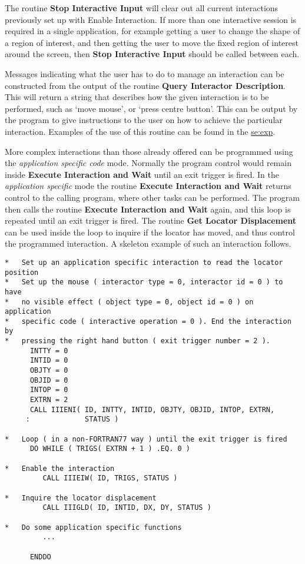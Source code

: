 The routine {\bf Stop Interactive Input} will clear out all current
interactions previously set up with {Enable Interaction}. If more than
one interactive session is required in a single application, for
example getting a user to change the shape of a region of interest,
and then getting the user to move the fixed region of interest around
the screen, then {\bf Stop Interactive Input} should be called between
each.

Messages indicating what the user has to do to manage an interaction
can be constructed from the output of the routine
{\bf Query Interactor Description}. This will return a string that describes
how the given interaction is to be performed, such as `move mouse', or
`press centre button'. This can be output by the program to give
instructions to the user on how to achieve the particular interaction.
Examples of the use of this routine can be found in the 
\hyperref{example program}{example program in appendix~}{}{se:exp}.

More complex interactions than those already offered can be programmed
using the {\it application specific code} mode. Normally the program control
would remain inside {\bf Execute Interaction and Wait} until an exit
trigger is fired. In the {\it application specific} mode the routine
{\bf Execute Interaction and Wait} returns control to the calling program,
where other tasks can be performed. The program then calls the routine
{\bf Execute Interaction and Wait} again, and this loop is repeated until
an exit trigger is fired. The routine {\bf Get Locator Displacement} can
be used inside the loop to inquire if the locator has moved,
and thus control the programmed interaction. A skeleton example of
such an interaction follows.
\begin{small}
\begin{verbatim}
*   Set up an application specific interaction to read the locator position
*   Set up the mouse ( interactor type = 0, interactor id = 0 ) to have
*   no visible effect ( object type = 0, object id = 0 ) on application
*   specific code ( interactive operation = 0 ). End the interaction by
*   pressing the right hand button ( exit trigger number = 2 ).
      INTTY = 0
      INTID = 0
      OBJTY = 0
      OBJID = 0
      INTOP = 0
      EXTRN = 2
      CALL IIIENI( ID, INTTY, INTID, OBJTY, OBJID, INTOP, EXTRN,
     :             STATUS )

*   Loop ( in a non-FORTRAN77 way ) until the exit trigger is fired
      DO WHILE ( TRIGS( EXTRN + 1 ) .EQ. 0 )

*   Enable the interaction
         CALL IIIEIW( ID, TRIGS, STATUS )

*   Inquire the locator displacement
         CALL IIIGLD( ID, INTID, DX, DY, STATUS )

*   Do some application specific functions
         ...

      ENDDO
\end{verbatim}
\end{small}

